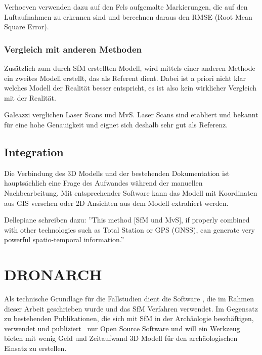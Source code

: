 				Verhoeven \etal{} verwenden dazu auf den Fels aufgemalte Markierungen, die auf den Luftaufnahmen zu erkennen sind und berechnen daraus den RMSE (Root Mean Square Error).

			\subsubsection{Vergleich mit anderen Methoden}
				Zusätzlich zum durch SfM erstellten Modell, wird mittels einer anderen Methode ein zweites Modell erstellt, das als Referent dient. Dabei ist a priori nicht klar welches Modell der Realität besser entspricht, es ist also kein wirklicher Vergleich mit der Realität.
				
				Galeazzi \etal{} verglichen Laser Scans und MvS. Laser Scans sind etabliert und bekannt für eine hohe Genauigkeit und eignet sich deshalb sehr gut als Referenz.
			
		\subsection{Integration}
			Die Verbindung des 3D Modells und der bestehenden Dokumentation ist hauptsächlich eine Frage des Aufwandes während der manuellen Nachbearbeitung. Mit entsprechender Software kann das Modell mit Koordinaten aus GIS versehen oder 2D Ansichten aus dem Modell extrahiert werden.
			
			Dellepiane \etal schreiben dazu: ''This method [SfM und MvS], if properly combined with other technologies such as Total Station or GPS (GNSS), can generate very powerful spatio-temporal information.''
		
	\section{DRONARCH}
		Als technische Grundlage für die Fallstudien dient die Software \dronarch{}, die im Rahmen dieser Arbeit geschrieben wurde und das SfM Verfahren verwendet.
		Im Gegensatz zu bestehenden Publikationen, die sich mit SfM in der Archäologie beschäftigen, verwendet und publiziert \dronarch\ nur Open Source Software und will ein Werkzeug bieten mit wenig Geld und Zeitaufwand 3D Modell für den archäologischen Einsatz zu erstellen.

	